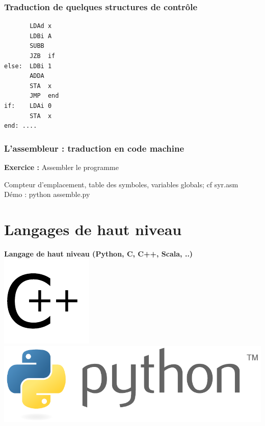 \documentclass{beamer}
\begin{document}
\begin{frame}[fragile]
\frametitle{Traduction de quelques structures de contrôle}

\begin{algorithmic}[1]
\Else
{}
\EndIf
\end{algorithmic}

\begin{small}
\begin{verbatim}
       LDAd x
       LDBi A
       SUBB
       JZB  if 
else:  LDBi 1
       ADDA
       STA  x
       JMP  end
if:    LDAi 0
       STA  x
end: ....
\end{verbatim}
\end{small}
\end{frame}

\begin{frame}
\frametitle{L'assembleur : traduction en code machine}
\textbf{Exercice :} Assembler le programme 

\begin{algorithmic}[1]
\EndWhile
{}
\Else
{}
\EndIf
\EndFunction
\end{algorithmic}

Compteur d'emplacement, table des symboles, variables globals; cf syr.asm\\
Démo : python assemble.py

\end{frame}


\section{Langages de haut niveau}

\begin{frame}
\centering\textbf{Langage de haut niveau (Python, C, C++, Scala, ..)}\\

\includegraphics[width=0.2\linewidth]{Figs/C_plus_plus.pdf}\hfill\includegraphics[width=0.4\linewidth]{Figs/Python.pdf}
\end{frame}
\end{document}
